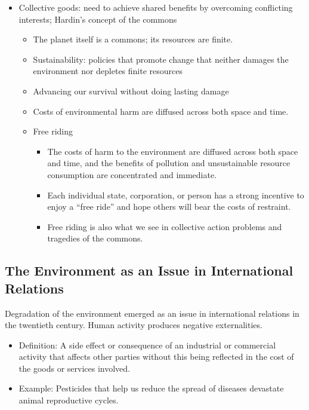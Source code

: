 \documentclass[
]{book}
\begin{document}
\begin{itemize}
\item
  Collective goods: need to achieve shared benefits by overcoming conflicting interests; Hardin's concept of the commons

  \begin{itemize}
  \item
    The planet itself is a commons; its resources are finite.
  \item
    Sustainability: policies that promote change that neither damages the environment nor depletes finite resources
  \item
    Advancing our survival without doing lasting damage
  \item
    Costs of environmental harm are diffused across both space and time.
  \item
    Free riding

    \begin{itemize}
    \item
      The costs of harm to the environment are diffused across both space and time, and the benefits of pollution and unsustainable resource consumption are concentrated and immediate.
    \item
      Each individual state, corporation, or person has a strong incentive to enjoy a ``free ride'' and hope others will bear the costs of restraint.
    \item
      Free riding is also what we see in collective action problems and tragedies of the commons.
    \end{itemize}
  \end{itemize}
\end{itemize}

\hypertarget{the-environment-as-an-issue-in-international-relations}{%
\subsection{The Environment as an Issue in International Relations}\label{the-environment-as-an-issue-in-international-relations}}

Degradation of the environment emerged as an issue in international relations in the twentieth century. Human activity produces negative externalities.

\begin{itemize}
\item
  Definition: A side effect or consequence of an industrial or commercial activity that affects other parties without this being reflected in the cost of the goods or services involved.
\item
  Example: Pesticides that help us reduce the spread of diseases devastate animal reproductive cycles.
\end{itemize}
\end{document}
